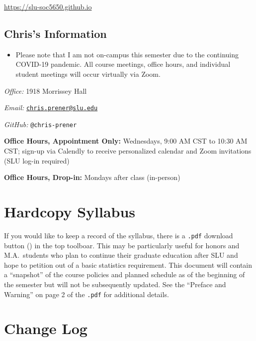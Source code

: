 \documentclass[
]{book}
\newenvironment{rmdblock}[1]
  {\begin{shaded*}
  \begin{itemize}
  \renewcommand{\labelitemi}{
    \raisebox{-.7\height}[0pt][0pt]{
      {\setkeys{Gin}{width=3em,keepaspectratio}\texttt{[image: images/\#1]}}
    }
  }
  \item
  }
  {
  \end{itemize}
  \end{shaded*}
  }
\newenvironment{rmdwarning}
  {\begin{rmdblock}{warning}}
  {\end{rmdblock}}
\begin{document}
\url{https://slu-soc5650.github.io}

\hypertarget{chriss-information}{%
\subsection*{Chris's Information}\label{chriss-information}}

\begin{rmdwarning}
Please note that I am not on-campus this semester due to the continuing
COVID-19 pandemic. All course meetings, office hours, and individual
student meetings will occur virtually via Zoom.
\end{rmdwarning}

\emph{Office:} 1918 Morrissey Hall

\emph{Email:} \href{mailto:chris.prener@slu.edu}{\nolinkurl{chris.prener@slu.edu}}

\emph{GitHub:} \texttt{@chris-prener}

\textbf{Office Hours, Appointment Only:} Wednesdays, 9:00 AM CST to 10:30 AM CST; sign-up via Calendly to receive personalized calendar and Zoom invitations (SLU log-in required)

\textbf{Office Hours, Drop-in:} Mondays after class (in-person)

\hypertarget{hardcopy-syllabus}{%
\section*{Hardcopy Syllabus}\label{hardcopy-syllabus}}

If you would like to keep a record of the syllabus, there is a \texttt{.pdf} download button () in the top toolboar. This may be particularly useful for honors and M.A.~students who plan to continue their graduate education after SLU and hope to petition out of a basic statistics requirement. This document will contain a ``snapshot'' of the course policies and planned schedule as of the beginning of the semester but will not be subsequently updated. See the ``Preface and Warning'' on page 2 of the \texttt{.pdf} for additional details.

\hypertarget{change-log}{%
\section*{Change Log}\label{change-log}}
\end{document}
